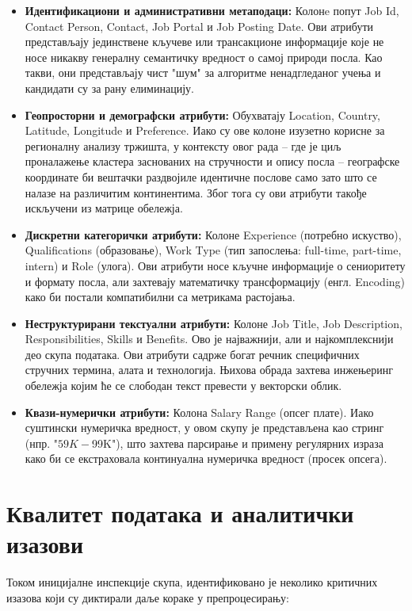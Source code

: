 \documentclass[a4paper,12pt]{report}
\begin{document}
	\begin{itemize}
	
	\item \textbf{Идентификациони и административни метаподаци:} Колонe попут Job Id, Contact Person, Contact, Job Portal и Job Posting Date. Ови атрибути представљају јединствене кључеве или трансакционе информације које не носе никакву генералну семантичку вредност о самој природи посла. Као такви, они представљају чист "шум" за алгоритме ненадгледаног учења и кандидати су за рану елиминацију.
	
	\item \textbf{Геопросторни и демографски атрибути:} Обухватају Location, Country, Latitude, Longitude и Preference. Иако су ове колоне изузетно корисне за регионалну анализу тржишта, у контексту овог рада – где је циљ проналажење кластера заснованих на стручности и опису посла – географске координате би вештачки раздвојиле идентичне послове само зато што се налазе на различитим континентима. Због тога су ови атрибути такође искључени из матрице обележја.
	
	\item \textbf{Дискретни категорички атрибути:} Колоне Experience (потребно искуство), Qualifications (образовање), Work Type (тип запослења: full-time, part-time, intern) и Role (улога). Ови атрибути носе кључне информације о сениоритету и формату посла, али захтевају математичку трансформацију (енгл. Encoding) како би постали компатибилни са метрикама растојања.
	
	\item \textbf{Неструктурирани текстуални атрибути:} Колоне Job Title, Job Description, Responsibilities, Skills и Benefits. Ово је најважнији, али и најкомплекснији део скупа података. Ови атрибути садрже богат речник специфичних стручних термина, алата и технологија. Њихова обрада захтева инжењеринг обележја којим ће се слободан текст превести у векторски облик.
	
	\item \textbf{Квази-нумерички атрибути:} Колона Salary Range (опсег плате). Иако суштински нумеричка вредност, у овом скупу је представљена као стринг (нпр. "$59K-$99K"), што захтева парсирање и примену регулярних израза како би се екстраховала континуална нумеричка вредност (просек опсега).
	
	\end{itemize}

	\section{Квалитет података и аналитички изазови}
	Током иницијалне инспекције скупа, идентификовано је неколико критичних изазова који су диктирали даље кораке у препроцесирању:
	
\end{document}
